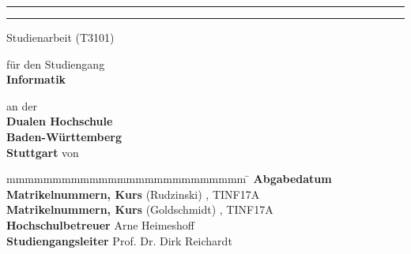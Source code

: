 \hfill
{}

\vfill\vfill

\begin{center}
	\rule{\linewidth}{1pt}
	{
		\Huge \bfseries
			\@title
		\par	
	}
	\vspace{-0.2cm}
	\rule{\linewidth}{1pt}
	

	Studienarbeit (T3101)
	\vfill
	
	für den Studiengang \\ \textbf{Informatik}
	
	an der \\ \textbf{Dualen Hochschule \\Baden-Württemberg\\Stuttgart}
	\vfill
	von \\ \textbf{\textsc{\@author}}
\end{center}

\vfill\vfill

\begin{tabbing}
	mmmmmmmmmmmmmmmmmmmmmmmmmm				\= \kill
	\textbf{Abgabedatum} \> \@date \\
	\textbf{Matrikelnummern, Kurs} (Rudzinski) , TINF17A \\
	\textbf{Matrikelnummern, Kurs} (Goldschmidt) , TINF17A \\
	\textbf{Hochschulbetreuer} \> Arne Heimeshoff \\ 
	\textbf{Studiengangsleiter} \> Prof. Dr. Dirk Reichardt
\end{tabbing}